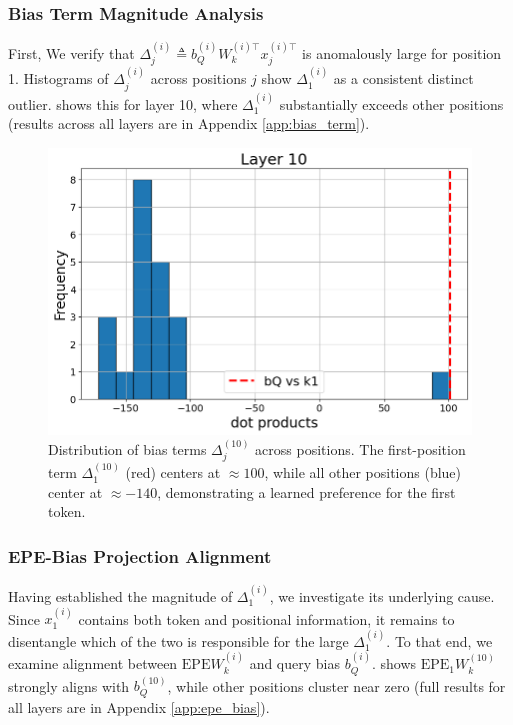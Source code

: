 \documentclass[11pt]{article}
\newif\ifBacklogcomments
\newcommand{\Backlog}[1]{\ifBacklogcomments\textcolor{blue}{[Backlog: #1]}\fi}
\begin{document}
\subsubsection{Bias Term Magnitude Analysis}
\label{sec:delta_analysis}
First, We verify that $\Delta_j^{(i)} \triangleq b_Q^{(i)}W_k^{(i)\top} x_j^{(i)\top}$ is anomalously large for position 1. Histograms of $\Delta_j^{(i)}$ across positions $j$ show $\Delta_1^{(i)}$ as a consistent distinct outlier.  shows this for layer 10, where $\Delta_1^{(i)}$ substantially exceeds other positions (results across all layers are in Appendix \ref{app:bias_term}).

\begin{figure}[t]
  \includegraphics[width=\columnwidth]{figures/obs1_layer10.png}
  \caption{Distribution of bias terms $\Delta_j^{(10)}$ across positions. The first-position term $\Delta_1^{(10)}$ (red) centers at $\approx 100$, while all other positions (blue) center at $\approx -140$, demonstrating a learned preference for the first token.}
  \label{fig:obs1_layer10}
\end{figure}

\subsubsection{EPE-Bias Projection Alignment}
\label{sec:epe_alignment}
Having established the magnitude of $\Delta_1^{(i)}$, we investigate its underlying cause. Since $x_1^{(i)}$ contains both token and positional information, it remains to disentangle which of the two is responsible for the large $\Delta_1^{(i)}$. To that end, we examine alignment between $\mathrm{EPE}W_k^{(i)}$ and query bias $b_Q^{(i)}$.  shows $\mathrm{EPE}_1W_k^{(10)}$ strongly aligns with $b_Q^{(10)}$, while other positions cluster near zero (full results for all layers are in Appendix \ref{app:epe_bias}).\Backlog{If we can also do that for $x_1^{(i)}-\mathrm{EPE}_1$ and show that this isn't aligned that would be great for this paragraph (we can put it in the appendix and just write it casually. This is not top priority at all.)}
\end{document}
